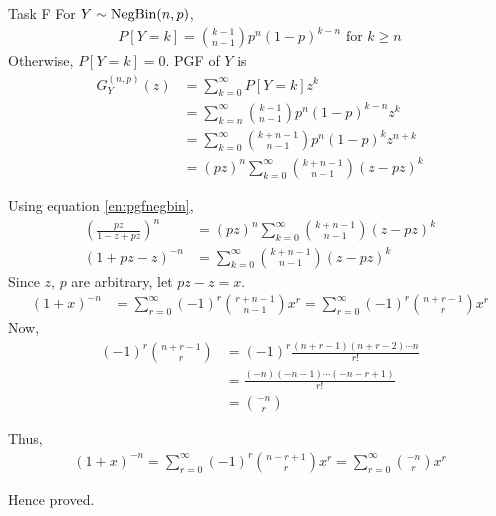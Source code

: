 \begin{task}{ Task F }
	For $Y\sim\text{NegBin}(n,p)$,
	\begin{align}
		P[Y=k] = \binom{k-1}{n-1}p^n(1-p)^{k-n}
		\text{ for } k\geq n
	\end{align}
	Otherwise, $P[Y=k]=0$. PGF of $Y$ is
	\begin{align}
		G_Y^{(n,p)}(z) & = \sum_{k=0}^\infty P[Y=k]z^k                           \\
		               & = \sum_{k=n}^\infty \binom{k-1}{n-1}p^n(1-p)^{k-n}z^k   \\
		               & = \sum_{k=0}^\infty \binom{k+n-1}{n-1}p^n(1-p)^kz^{n+k} \\
		               & = (pz)^n\sum_{k=0}^\infty \binom{k+n-1}{n-1}(z-pz)^k
	\end{align}

	Using equation \ref{en:pgfnegbin},
	\begin{align}
		\left(\frac{pz}{1-z+pz}\right)^n & = (pz)^n\sum_{k=0}^\infty
		\binom{k+n-1}{n-1}(z-pz)^k                                   \\
		\left(1+pz-z\right)^{-n}         & = \sum_{k=0}^\infty
		\binom{k+n-1}{n-1}(z-pz)^k
	\end{align}
	Since $z$, $p$ are arbitrary, let $pz-z = x$.
	\begin{align}
		(1+x)^{-n} & = \sum_{r=0}^\infty (-1)^r\binom{r+n-1}{n-1}x^r =
		\sum_{r=0}^\infty (-1)^r\binom{n+r-1}{r}x^r
	\end{align}
	Now,
	\begin{align}
		(-1)^r\binom{n+r-1}{r} & = (-1)^r\frac{(n+r-1)(n+r-2)\cdots n}{r!} \\
		                       & = \frac{(-n)(-n-1)\cdots (-n-r+1)}{r!}    \\
		                       & = \binom{-n}{r}
	\end{align}

	Thus,
	\begin{align}
		(1+x)^{-n} = \sum_{r=0}^\infty (-1)^r\binom{n-r+1}{r} x^r=
		\sum_{r=0}^\infty \binom{-n}{r}x^r
	\end{align}

	Hence proved.
\end{task}





